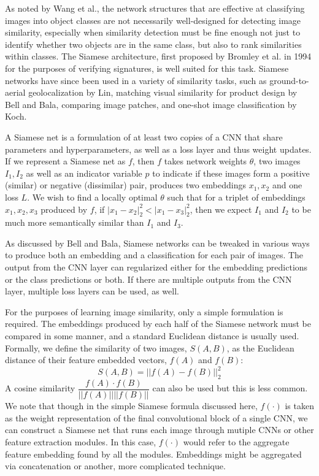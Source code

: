 As noted by Wang et al.\cite{wang2014learning}, the network structures that are effective at classifying images into object classes are not necessarily well-designed for detecting image similarity, especially when similarity detection must be fine enough not just to identify whether two objects are in the same class, but also to rank similarities within classes. The Siamese architecture, first proposed by Bromley et al. in 1994\cite{bromley1993signature} for the purposes of verifying signatures, is well suited for this task. Siamese networks have since been used in a variety of similarity tasks, such as ground-to-aerial geolocalization by Lin\cite{lin2015learning}, matching visual similarity for product design by Bell and Bala\cite{bell2015learning}, comparing image patches\cite{zagoruyko2015learning}, and one-shot image classification by Koch\cite{koch2015siamese}.

A Siamese net is a formulation of at least two copies of a CNN that share parameters and hyperparameters, as well as a loss layer and thus weight updates. If we represent a Siamese net as $f$, then $f$ takes network weights $\theta$, two images \textbf{$I_1, I_2$} as well as an indicator variable $p$ to indicate if these images form a positive (similar) or negative (dissimilar) pair, produces two embeddings $x_1, x_2$ and one loss $L$. We wish to find a locally optimal $\theta$ such that for a triplet of embeddings $x_1, x_2, x_3$ produced by $f$, if $|x_1 - x_2|_2^2 < |x_1 - x_3|_2^2$, then we expect \textbf{$I_1$} and \textbf{$I_2$} to be much more semantically similar than \textbf{$I_1$} and \textbf{$I_3$}.

As discussed by Bell and Bala\cite{bell2015learning}, Siamese networks can be tweaked in various ways to produce both an embedding and a classification for each pair of images. The output from the CNN layer can regularized either for the embedding predictions or the class predictions or both. If there are multiple outputs from the CNN layer, multiple loss layers can be used, as well.

For the purposes of learning image similarity, only a simple formulation is required. The embeddings produced by each half of the Siamese network must be compared in some manner, and a standard Euclidean distance is usually used. Formally, we define the similarity of two images, $S(A,B)$, as the Euclidean distance of their feature embedded vectors, $f(A)$ and $f(B)$:
\begin{equation}
S(A,B) = ||f(A) - f(B)||_2^2
\end{equation}
A cosine similarity $\dfrac{f(A) \cdot f(B)}{||f(A)||||f(B)||}$ can also be used but this is less common. We note that though in the simple Siamese formula discussed here, $f(\cdot)$ is taken as the weight representation of the final convolutional block of a single CNN, we can construct a Siamese net that runs each image through mutiple CNNs or other feature extraction modules. In this case, $f(\cdot)$ would refer to the aggregate feature embedding found by all the modules. Embeddings might be aggregated via concatenation or another, more complicated technique.

